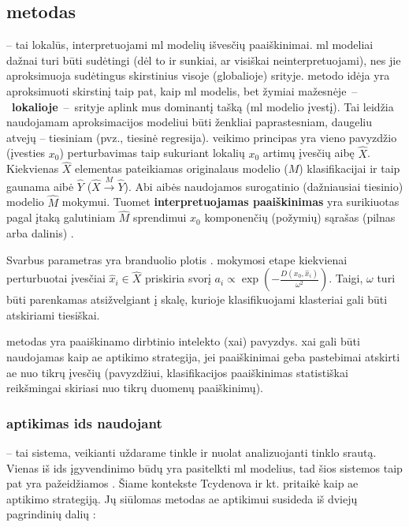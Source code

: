\subsection{\LIME metodas}\label{sec:literature:lime}

\LIME {} -- tai lokalūs, interpretuojami \gls{ml} modelių išvesčių paaiškinimai. \gls{ml} modeliai dažnai turi būti sudėtingi (dėl to ir sunkiai, ar visiškai neinterpretuojami), nes jie aproksimuoja sudėtingus skirstinius visoje (globalioje) srityje. \LIME metodo idėja yra aproksimuoti skirstinį taip pat, kaip \gls{ml} modelis, bet žymiai mažesnėje~--~\textbf{lokalioje}~--~srityje  aplink mus dominantį tašką (\gls{ml} modelio įvestį). Tai leidžia \LIME naudojamam aproksimacijos modeliui būti ženkliai paprastesniam, daugeliu atvejų -- tiesiniam (pvz., tiesinė regresija).
\LIME veikimo principas yra vieno pavyzdžio (įvesties $x_0$) perturbavimas taip sukuriant lokalių $x_0$ artimų įvesčių aibę $\hat{X}$. Kiekvienas $\hat{X}$ elementas pateikiamas originalaus modelio ($M$) klasifikacijai ir taip gaunama aibė $\hat{Y}$ ($\hat{X} \xrightarrow{M} \hat{Y}$). Abi aibės naudojamos surogatinio (dažniausiai tiesinio) modelio $\hat{M}$ mokymui. Tuomet \textbf{interpretuojamas paaiškinimas} yra surikiuotas pagal įtaką galutiniam $\hat{M}$ sprendimui $x_0$ komponenčių (požymių) sąrašas (pilnas arba dalinis) \cite{ribeiroWhyShouldTrust2016}.

Svarbus \LIME parametras yra branduolio plotis  \omega. \LIME mokymosi etape kiekvienai perturbuotai įvesčiai $\hat{x}_i \in \hat{X}$ priskiria svorį $a_i \propto \exp\left(-\frac{D(x_0, \hat{x}_i)}{\omega^2}\right)$. Taigi, $\omega$ turi būti parenkamas atsižvelgiant į skalę, kurioje klasifikuojami klasteriai gali būti atskiriami tiesiškai.

\LIME metodas yra paaiškinamo dirbtinio intelekto (\gls{xai}) pavyzdys. \gls{xai} gali būti naudojamas kaip \gls{ae} aptikimo strategija, jei paaiškinimai geba pastebimai atskirti \gls{ae} nuo tikrų įvesčių (pavyzdžiui, klasifikacijos paaiškinimas statistiškai reikšmingai skiriasi nuo tikrų duomenų paaiškinimų).

\subsubsection{ aptikimas \gls{ids} naudojant \LIME}\label{sec:literature:defense:ids}

 -- tai sistema, veikianti uždarame tinkle ir nuolat analizuojanti tinklo srautą. Vienas iš \gls{ids} įgyvendinimo būdų yra pasitelkti \gls{ml} modelius, tad šios sistemos taip pat yra pažeidžiamos . Šiame kontekste Tcydenova ir kt. pritaikė \LIME kaip \gls{ae} aptikimo strategiją. Jų siūlomas metodas  \gls{ae} aptikimui susideda iš dviejų pagrindinių dalių \cite{tcydenovaDetectionAdversarialAttacks2021}:

